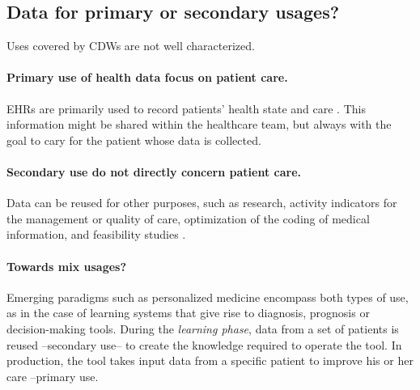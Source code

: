% 


\subsection{Data for primary or secondary usages?}%
\label{subsec:cdw:data_usages}%

Uses covered by CDWs are not well characterized.

\paragraph{Primary use of health data focus on patient care.}
EHRs are primarily used to record patients' health state and care
\citep{safran_toward_2007,eu_primary_2022}. This information might be shared within the
healthcare team, but always with the goal to cary for the patient whose data is
collected.


\paragraph{Secondary use do not directly concern patient care.} Data can be
reused for other purposes, such as research, activity indicators for the
management or quality of care, optimization of the coding of medical
information, and feasibility studies
\citep{safran_toward_2007,cnil_referentiel_2021}.

\paragraph{Towards mix usages?}
Emerging paradigms such as personalized medicine encompass both types of use,
as in the case of learning systems that give rise to diagnosis, prognosis or
decision-making tools. During the \textit{learning phase}, data from a set of
patients is reused --secondary use-- to create the knowledge required to
operate the tool. In production, the tool takes input data from a specific
patient to improve his or her care --primary use.
